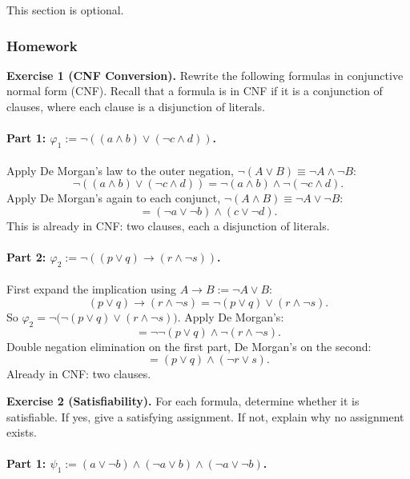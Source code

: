 \documentclass{article}
\theoremstyle{theorem}
\theoremstyle{definition}
\theoremstyle{remark}
\begin{document}
This section is optional. 

\subsubsection{Homework}

\textbf{Exercise 1 (CNF Conversion).}
Rewrite the following formulas in conjunctive normal form (CNF). Recall that a formula is in CNF if it is a conjunction of clauses, where each clause is a disjunction of literals.

\paragraph{Part 1: $\varphi_1 := \lnot((a \land b) \lor (\lnot c \land d))$.}

Apply De Morgan's law to the outer negation, $\lnot(A \lor B) \equiv \lnot A \land \lnot B$:
\[
  \lnot((a \land b) \lor (\lnot c \land d)) = \lnot(a \land b) \land \lnot(\lnot c \land d).
\]
Apply De Morgan's again to each conjunct, $\lnot(A \land B) \equiv \lnot A \lor \lnot B$:
\[
  = (\lnot a \lor \lnot b) \land (c \lor \lnot d).
\]
This is already in CNF: two clauses, each a disjunction of literals.

\paragraph{Part 2: $\varphi_2 := \lnot((p \lor q) \to (r \land \lnot s))$.}

First expand the implication using $A \to B := \lnot A \lor B$:
\[
  (p \lor q) \to (r \land \lnot s) = \lnot(p \lor q) \lor (r \land \lnot s).
\]
So $\varphi_2 = \lnot\bigl(\lnot(p \lor q) \lor (r \land \lnot s)\bigr)$. Apply De Morgan's:
\[
  = \lnot\lnot(p \lor q) \land \lnot(r \land \lnot s).
\]
Double negation elimination on the first part, De Morgan's on the second:
\[
  = (p \lor q) \land (\lnot r \lor s).
\]
Already in CNF: two clauses.

\bigskip

\textbf{Exercise 2 (Satisfiability).}
For each formula, determine whether it is satisfiable. If yes, give a satisfying assignment. If not, explain why no assignment exists.

\paragraph{Part 1: $\psi_1 := (a \lor \lnot b) \land (\lnot a \lor b) \land (\lnot a \lor \lnot b)$.}
\end{document}
